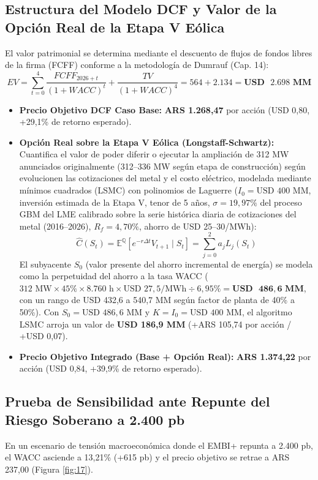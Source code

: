 \documentclass[11pt,a4paper]{article}
\begin{document}
\subsection{Estructura del Modelo DCF y Valor de la Opción Real de la Etapa V Eólica}
El valor patrimonial se determina mediante el descuento de flujos de fondos libres de la firma (FCFF) conforme a la metodología de Dumrauf (Cap. 14):
\begin{equation}
    EV = \sum_{t=0}^{4} \frac{FCFF_{2026+t}}{(1 + WACC)^t} + \frac{TV}{(1 + WACC)^4} = 564 + 2.134 = \mathbf{USD\text{ }2.698\text{ MM}}
\end{equation}
\begin{itemize}
    \item \textbf{Precio Objetivo DCF Caso Base:} \textbf{ARS 1.268,47} por acción (USD 0,80, +29,1\% de retorno esperado).
    \item \textbf{Opción Real sobre la Etapa V Eólica (Longstaff-Schwartz):} Cuantifica el valor de poder diferir o ejecutar la ampliación de 312 MW anunciados originalmente (312--336 MW según etapa de construcción) según evolucionen las cotizaciones del metal y el costo eléctrico, modelada mediante mínimos cuadrados (LSMC) con polinomios de Laguerre ($I_0 = \text{USD } 400\text{ MM}$, inversión estimada de la Etapa V, tenor de 5 años, $\sigma = 19,97\%$ del proceso GBM del LME calibrado sobre la serie histórica diaria de cotizaciones del metal (2016--2026), $R_f = 4,70\%$, ahorro de USD 25--30/MWh):
    \begin{equation}
        \hat{C}(S_t) = \mathbb{E}^{\mathbb{Q}}\left[ e^{-r \Delta t} V_{t+1} \mid S_t \right] = \sum_{j=0}^{2} a_j L_j(S_t)
    \end{equation}
    El subyacente $S_0$ (valor presente del ahorro incremental de energía) se modela como la perpetuidad del ahorro a la tasa WACC ($312\text{ MW} \times 45\% \times 8.760\text{ h} \times \text{USD }27,5/\text{MWh} \div 6,95\% = \mathbf{USD\text{ }486,6\text{ MM}}$, con un rango de USD 432,6 a 540,7 MM según factor de planta de 40\% a 50\%). Con $S_0 = \text{USD }486,6\text{ MM}$ y $K = I_0 = \text{USD }400\text{ MM}$, el algoritmo LSMC arroja un valor de \textbf{USD 186,9 MM} (+ARS 105,74 por acción / +USD 0,07).
    \item \textbf{Precio Objetivo Integrado (Base + Opción Real):} \textbf{ARS 1.374,22} por acción (USD 0,84, +39,9\% de retorno esperado).
\end{itemize}

\subsection{Prueba de Sensibilidad ante Repunte del Riesgo Soberano a 2.400 pb}
En un escenario de tensión macroeconómica donde el EMBI+ repunta a 2.400 pb, el WACC asciende a 13,21\% (+615 pb) y el precio objetivo se retrae a ARS 237,00 (Figura \ref{fig:17}).
\end{document}
